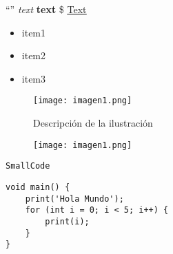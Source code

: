 
“”                                         %
\textit {text}                             %
\textbf{text}                              %
\$                                         %
\href{url}{\color{blue}\underline{Text}}   %
\begin{itemize}
    \item item1
    
    \item item2
    
    \item item3
\end{itemize}

\begin{figure}[H]
    \centering
    \texttt{[image: imagen1.png]}
    \caption{Descripción de la ilustración}
    \label{fig:reference}
\end{figure}


\begin{figure}[H]
    \centering
    \texttt{[image: imagen1.png]}
\end{figure}


\parencite{NameOfTheAuthor}


\lstinline{SmallCode}


\begin{center}
\begin{lstlisting}
void main() {
    print('Hola Mundo');
    for (int i = 0; i < 5; i++) {
        print(i);
    }
}
\end{lstlisting}
\end{center}